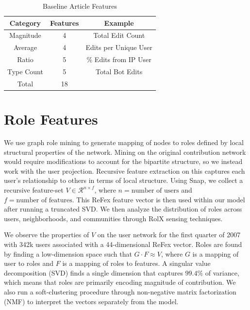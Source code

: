 \documentclass[letterpaper, 12pt, conference]{ieeeconf}
\begin{document}
\begin{table}[ht]
    \centering
    \caption{Baseline Article Features}
    \begin{tabular}{c|c|c}
        \toprule
        Category & Features & Example \\
        \midrule
        Magnitude & 4 & Total Edit Count \\
        Average & 4 & Edits per Unique User \\
        Ratio & 5 & \% Edits from IP User \\
        Type Count & 5 & Total Bot Edits \\
        Total & 18 \\
        \bottomrule
    \end{tabular}
    \label{tab:article_features}
\end{table}


\section{Role Features}

We use graph role mining to generate mapping of nodes to roles defined by local structural properties of the network. Mining on the original contribution network would require modifications to account for the bipartite structure, so we instead work with the user projection. Recursive feature extraction on this captures each user's relationship to others in terms of local structure. Using Snap\cite{leskovec2016snap}, we collect a recursive feature-set $V \in \mathcal{R}^{n \times f}$, where $n = \text{number of users}$ and $f = \text{number of features}$. This ReFex feature vector \cite{henderson2011s} is then used within our model after running a truncated SVD. We then analyze the distribution of roles across users, neighborhoods, and communities through RolX sensing techniques.

We observe the properties of $V$ on the user network for the first quarter of 2007 with 342k users associated with a 44-dimensional ReFex vector. Roles are found by finding a low-dimension space such that $G \cdot F \approx V$, where $G$ is a mapping of user to roles and $F$ is a mapping of roles to features. A singular value decomposition (SVD) finds a single dimension that captures $99.4\%$ of variance, which means that roles are primarily encoding magnitude of contribution. We also run a soft-clustering procedure through non-negative matrix factorization (NMF) to interpret the vectors separately from the model.
\end{document}
